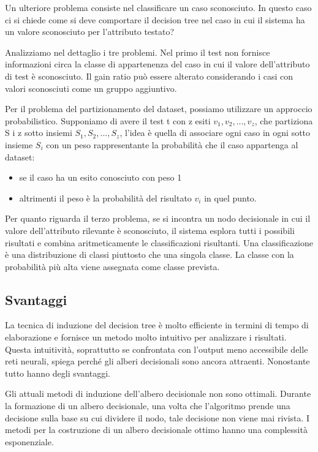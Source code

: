 \documentclass[a4paper]{extarticle}
\begin{document}
Un ulteriore problema consiste nel classificare un caso sconosciuto. In questo caso ci si chiede come si deve comportare il decision tree nel caso in cui il sistema ha un valore sconosciuto per l'attributo testato?

Analizziamo nel dettaglio i tre problemi. Nel primo il test non fornisce informazioni circa la classe di appartenenza del caso in cui il valore dell'attributo di test è sconosciuto. Il gain ratio può essere alterato considerando i casi con valori sconosciuti come un gruppo aggiuntivo.

Per il problema del partizionamento del dataset, possiamo utilizzare un approccio probabilistico. Supponiamo di avere il test t con z esiti $v_1,v_2,...,v_z$, che partiziona S i z sotto insiemi $S_1,S_2,...,S_z$, l'idea è quella di associare ogni caso in ogni sotto insieme $S_i$ con un peso rappresentante la probabilità che il caso appartenga al dataset:

\begin{itemize}
\item se il caso ha un esito conosciuto con peso 1
\item altrimenti il peso è la probabilità del risultato $v_i$ in quel punto.
\end{itemize}

Per quanto riguarda il terzo problema, se si incontra un nodo decisionale in cui il valore dell'attributo rilevante è sconosciuto, il sistema esplora tutti i possibili risultati e combina aritmeticamente le classificazioni risultanti. Una classificazione è una distribuzione di classi piuttosto che una singola classe. La classe con la probabilità più alta viene assegnata come classe prevista.

\subsection{Svantaggi}

La tecnica di induzione del decision tree è molto efficiente in termini di tempo di elaborazione e fornisce un metodo molto intuitivo per analizzare i risultati. Questa intuitività, soprattutto se confrontata con l'output meno accessibile delle reti neurali, spiega perché gli alberi decisionali sono ancora attraenti. Nonostante tutto hanno degli svantaggi.

Gli attuali metodi di induzione dell'albero decisionale non sono ottimali. Durante la formazione di un albero decisionale, una volta che l'algoritmo prende una decisione sulla base su cui dividere il nodo, tale decisione non viene mai rivista. I metodi per la costruzione di un albero decisionale ottimo hanno una complessità esponenziale.
\end{document}
